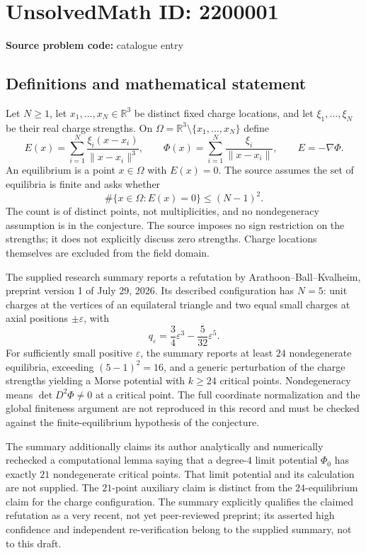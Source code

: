 \documentclass[11pt]{article}
\newcommand{\R}{\mathbb{R}}
\begin{document}
\section*{UnsolvedMath ID: 2200001}
\textbf{Source problem code:} catalogue entry
\subsection{Definitions and mathematical statement}
Let $N\geq1$, let $x_1,\ldots,x_N\in\R^3$ be distinct fixed charge locations, and let $\xi_1,\ldots,\xi_N$ be their real charge strengths. On $\Omega=\R^3\setminus\{x_1,\ldots,x_N\}$ define
\[
E(x)=\sum_{i=1}^N\frac{\xi_i(x-x_i)}{\|x-x_i\|^3},\qquad
\Phi(x)=\sum_{i=1}^N\frac{\xi_i}{\|x-x_i\|},\qquad E=-\nabla\Phi.
\]
An equilibrium is a point $x\in\Omega$ with $E(x)=0$. The source assumes the set of equilibria is finite and asks whether
\[
\#\{x\in\Omega:E(x)=0\}\leq(N-1)^2.
\]
The count is of distinct points, not multiplicities, and no nondegeneracy assumption is in the conjecture. The source imposes no sign restriction on the strengths; it does not explicitly discuss zero strengths. Charge locations themselves are excluded from the field domain.

The supplied research summary reports a refutation by Arathoon--Ball--Kvalheim, preprint version 1 of July 29, 2026. Its described configuration has $N=5$: unit charges at the vertices of an equilateral triangle and two equal small charges at axial positions $\pm\varepsilon$, with
\[
q_\varepsilon=\frac34\varepsilon^3-\frac5{32}\varepsilon^5.
\]
For sufficiently small positive $\varepsilon$, the summary reports at least $24$ nondegenerate equilibria, exceeding $(5-1)^2=16$, and a generic perturbation of the charge strengths yielding a Morse potential with $k\geq24$ critical points. Nondegeneracy means $\det D^2\Phi\ne0$ at a critical point. The full coordinate normalization and the global finiteness argument are not reproduced in this record and must be checked against the finite-equilibrium hypothesis of the conjecture.

The summary additionally claims its author analytically and numerically rechecked a computational lemma saying that a degree-$4$ limit potential $\Phi_0$ has exactly $21$ nondegenerate critical points. That limit potential and its calculation are not supplied. The $21$-point auxiliary claim is distinct from the $24$-equilibrium claim for the charge configuration. The summary explicitly qualifies the claimed refutation as a very recent, not yet peer-reviewed preprint; its asserted high confidence and independent re-verification belong to the supplied summary, not to this draft.
\end{document}

